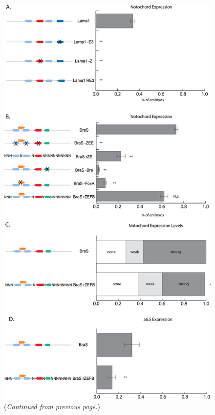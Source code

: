\captionsetup[figure]{list=no}
\begin{figure}[p]
    \includegraphics[scale=.5]{2_figures-and-files/FigS5_Notochord-Counting.png}
    \caption{(\textit{Continued from previous page.})}
\end{figure}
\captionsetup[figure]{list=yes}


